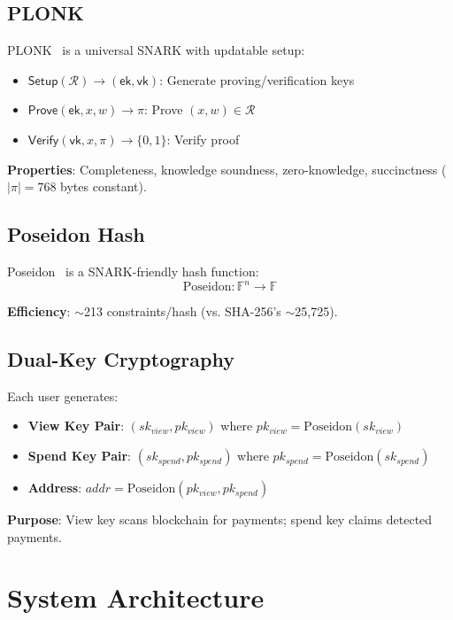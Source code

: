 \documentclass[conference]{IEEEtran}
\begin{document}
\subsection{PLONK}

PLONK~\cite{groth2016size} is a universal SNARK with updatable setup:

\begin{itemize}
    \item $\mathsf{Setup}(\mathcal{R}) \rightarrow (\mathsf{ek}, \mathsf{vk})$: Generate proving/verification keys
    \item $\mathsf{Prove}(\mathsf{ek}, x, w) \rightarrow \pi$: Prove $(x, w) \in \mathcal{R}$
    \item $\mathsf{Verify}(\mathsf{vk}, x, \pi) \rightarrow \{0,1\}$: Verify proof
\end{itemize}

\textbf{Properties}: Completeness, knowledge soundness, zero-knowledge, succinctness ($|\pi| = 768$ bytes constant).

\subsection{Poseidon Hash}

Poseidon~\cite{grassi2021poseidon} is a SNARK-friendly hash function:
$$\text{Poseidon}: \mathbb{F}^n \rightarrow \mathbb{F}$$ 

\textbf{Efficiency}: $\sim$213 constraints/hash (vs. SHA-256's $\sim$25,725).

\subsection{Dual-Key Cryptography}

Each user generates:

\begin{itemize}
    \item \textbf{View Key Pair}: $(sk_{view}, pk_{view})$ where $pk_{view} = \text{Poseidon}(sk_{view})$
    \item \textbf{Spend Key Pair}: $(sk_{spend}, pk_{spend})$ where $pk_{spend} = \text{Poseidon}(sk_{spend})$
    \item \textbf{Address}: $addr = \text{Poseidon}(pk_{view}, pk_{spend})$
\end{itemize}

\textbf{Purpose}: View key scans blockchain for payments; spend key claims detected payments.

% 
% 
\section{System Architecture}
\label{sec:arch}
\end{document}
